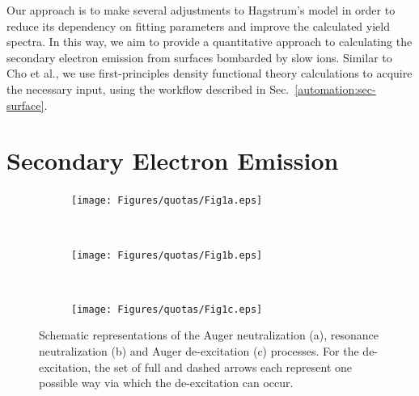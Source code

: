 \begin{refsection}
Our approach is to make several adjustments to Hagstrum's model in order to reduce its dependency on fitting parameters and improve the calculated yield spectra. In this way, we aim to provide a quantitative approach to calculating the secondary electron emission from surfaces bombarded by slow ions. Similar to Cho et al., we use first-principles density functional theory calculations to acquire the necessary input, using the workflow described in Sec.~\ref{automation:sec-surface}.

\section{Secondary Electron Emission} \label{quotas:sec-see}

\begin{figure}[t]
    \centering
    \begin{subfigure}[t]{0.3\textwidth}
        \centering
        \texttt{[image: Figures/quotas/Fig1a.eps]}
        \caption{}
    \end{subfigure}%
    ~ \hspace{1em}
    \begin{subfigure}[t]{0.3\textwidth}
        \centering
        \texttt{[image: Figures/quotas/Fig1b.eps]}
        \caption{}
    \end{subfigure}
    ~ \hspace{1em}
    \begin{subfigure}[t]{0.3\textwidth}
        \centering
        \texttt{[image: Figures/quotas/Fig1c.eps]}
        \caption{}
    \end{subfigure}%
    \caption{\label{quotas:fig-auger}Schematic representations of the Auger neutralization (a), resonance neutralization (b) and Auger de-excitation (c) processes. For the de-excitation, the set of full and dashed arrows each represent one possible way via which the de-excitation can occur.}
\end{figure}


\end{refsection}

